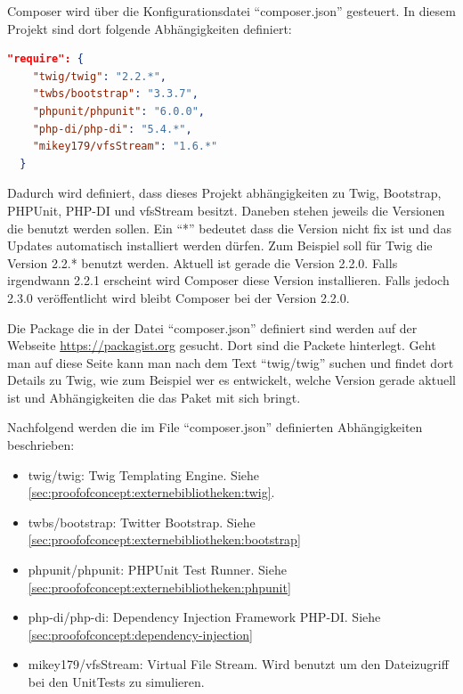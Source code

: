 Composer wird über die Konfigurationsdatei "`composer.json"' gesteuert. In diesem Projekt sind dort folgende Abhängigkeiten definiert:

\begin{lstlisting}[language=json]
  "require": {
    "twig/twig": "2.2.*",
    "twbs/bootstrap": "3.3.7",
    "phpunit/phpunit": "6.0.0",
    "php-di/php-di": "5.4.*",
    "mikey179/vfsStream": "1.6.*"
  }
\end{lstlisting}

Dadurch wird definiert, dass dieses Projekt abhängigkeiten zu Twig, Bootstrap, PHPUnit, PHP-DI und vfsStream besitzt. Daneben stehen jeweils die Versionen die benutzt werden sollen. Ein "`*"' bedeutet dass die Version nicht fix ist und das Updates automatisch installiert werden dürfen. Zum Beispiel soll für Twig die Version 2.2.* benutzt werden. Aktuell ist gerade die Version 2.2.0. Falls irgendwann 2.2.1 erscheint wird Composer diese Version installieren. Falls jedoch 2.3.0 veröffentlicht wird bleibt Composer bei der Version 2.2.0. 

Die Package die in der Datei "`composer.json"' definiert sind werden auf der Webseite \url{https://packagist.org} gesucht. Dort sind die Packete hinterlegt. Geht man auf diese Seite kann man nach dem Text "`twig/twig"' suchen und findet dort Details zu Twig, wie zum Beispiel wer es entwickelt, welche Version gerade aktuell ist und Abhängigkeiten die das Paket mit sich bringt.

Nachfolgend werden die im File "`composer.json"' definierten Abhängigkeiten beschrieben:
\begin{itemize}
	\item twig/twig: Twig Templating Engine. Siehe \cref{sec:proofofconcept:externebibliotheken:twig}.
	\item twbs/bootstrap: Twitter Bootstrap. Siehe \cref{sec:proofofconcept:externebibliotheken:bootstrap}
	\item phpunit/phpunit: PHPUnit Test Runner. Siehe \cref{sec:proofofconcept:externebibliotheken:phpunit}
	\item php-di/php-di: Dependency Injection Framework PHP-DI. Siehe \cref{sec:proofofconcept:dependency-injection}
	\item mikey179/vfsStream: Virtual File Stream. Wird benutzt um den Dateizugriff bei den UnitTests zu simulieren.
\end{itemize}


